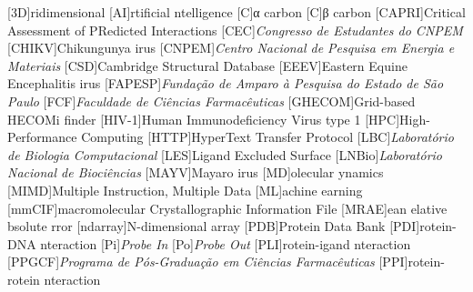 \documentclass[Ingles]{phdthesis}
\begin{document}
\listoftables
\clearpage


\begin{acronym} \itemsep=-8pt
  [3D]{ridimensional}
  [AI]{rtificial ntelligence}
  [C\textalpha]{α carbon}
  [C\textbeta]{β carbon}
  [CAPRI]{Critical Assessment of PRedicted Interactions}
  [CEC]{\textit{Congresso de Estudantes do CNPEM}}
  [CHIKV]{Chikungunya irus}
  [CNPEM]{\textit{Centro Nacional de Pesquisa em Energia e Materiais}}
  [CSD]{Cambridge Structural Database}
  [EEEV]{Eastern Equine Encephalitis irus}
  [FAPESP]{\textit{Fundação de Amparo à Pesquisa do Estado de São Paulo}}
  [FCF]{\textit{Faculdade de Ciências Farmacêuticas}}
  [GHECOM]{Grid-based HECOMi finder}
  [HIV-1]{Human Immunodeficiency Virus type 1}
  [HPC]{High-Performance Computing}
  [HTTP]{HyperText Transfer Protocol}
  [LBC]{\textit{Laboratório de Biologia Computacional}}
  [LES]{Ligand Excluded Surface}
  [LNBio]{\textit{Laboratório Nacional de Biociências}}
  [MAYV]{Mayaro irus}
  [MD]{olecular ynamics}
  [MIMD]{Multiple Instruction, Multiple Data}
  [ML]{achine earning}
  [mmCIF]{macromolecular Crystallographic Information File}
  [MRAE]{ean elative bsolute rror}
  [ndarray]{N-dimensional array}
  [PDB]{Protein Data Bank}
  [PDI]{rotein-DNA nteraction}
  [Pi]{\textit{Probe In}}
  [Po]{\textit{Probe Out}}
  [PLI]{rotein-igand nteraction}
  [PPGCF]{\textit{Programa de Pós-Graduação em Ciências Farmacêuticas}}
  [PPI]{rotein-rotein nteraction}

\end{acronym}
\end{document}
